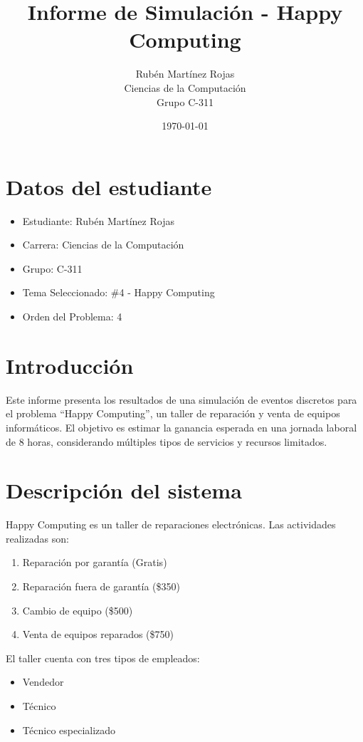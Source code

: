 \documentclass[12pt]{article}
\title{Informe de Simulación - Happy Computing}
\author{Rubén Martínez Rojas \\ Ciencias de la Computación \\ Grupo C-311}
\date{\today}
\begin{document}
\maketitle

\section*{Datos del estudiante}
\begin{itemize}
  \item Estudiante: Rubén Martínez Rojas
  \item Carrera: Ciencias de la Computación
  \item Grupo: C-311
  \item Tema Seleccionado: \#4 - Happy Computing
  \item Orden del Problema: 4
\end{itemize}

\section{Introducción}
Este informe presenta los resultados de una simulación de eventos discretos para el problema ``Happy Computing'', un taller de reparación y venta de equipos informáticos. El objetivo es estimar la ganancia esperada en una jornada laboral de 8 horas, considerando múltiples tipos de servicios y recursos limitados.

\section{Descripción del sistema}
Happy Computing es un taller de reparaciones electrónicas. Las actividades realizadas son:
\begin{enumerate}
  \item Reparación por garantía (Gratis)
  \item Reparación fuera de garantía (\$350)
  \item Cambio de equipo (\$500)
  \item Venta de equipos reparados (\$750)
\end{enumerate}

El taller cuenta con tres tipos de empleados:
\begin{itemize}
  \item Vendedor
  \item Técnico
  \item Técnico especializado
\end{itemize}
\end{document}
